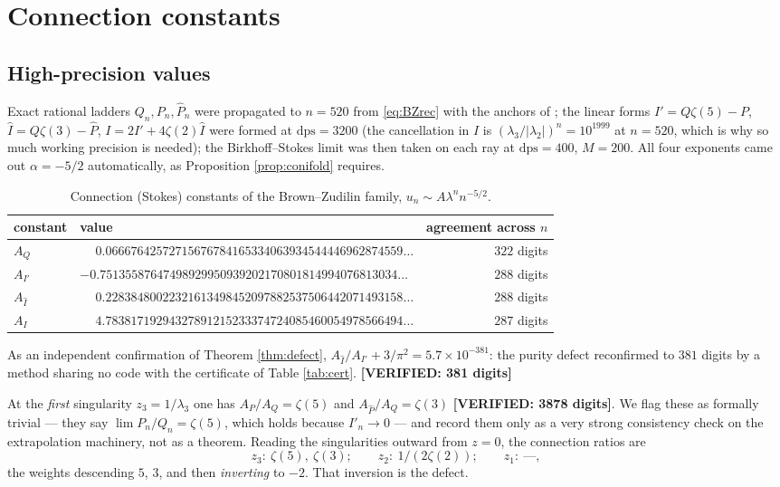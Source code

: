 \documentclass[11pt,reqno]{amsart}
\theoremstyle{plain}
\theoremstyle{definition}
\theoremstyle{remark}
\newcommand{\VER}[1]{{\normalfont\sffamily\bfseries[VERIFIED: #1]}}
\newcommand{\dps}{\mathrm{dps}}
\newcommand{\Ihat}{\widehat{I}}
\newcommand{\Phat}{\widehat{P}}
\begin{document}
\section{Connection constants}\label{sec:conn}

\subsection{High-precision values}
Exact rational ladders $Q_n,P_n,\Phat_n$ were propagated to $n=520$ from \eqref{eq:BZrec} with
the anchors of \cite{BZ}; the linear forms $I'=Q\zeta(5)-P$, $\Ihat=Q\zeta(3)-\Phat$,
$I=2I'+4\zeta(2)\Ihat$ were formed at $\dps=3200$ (the cancellation in $I$ is
$(\lambda_3/|\lambda_2|)^n=10^{1999}$ at $n=520$, which is why so much working precision is
needed); the Birkhoff--Stokes limit was then taken on each ray at $\dps=400$, $M=200$. All four
exponents came out $\alpha=-5/2$ automatically, as Proposition \ref{prop:conifold} requires.

\begin{table}[h]
\centering
\caption{Connection (Stokes) constants of the Brown--Zudilin family, $u_n\sim A\lambda^n
n^{-5/2}$.}
\label{tab:conn}
\small
\begin{tabular}{@{}llr@{}}
\toprule
constant & value & agreement across $n$\\
\midrule
$A_Q$      & $\phantom{-}0.06667642572715676784165334063934544446962874559\ldots$ & $322$ digits\\
$A_{I'}$   & $-0.75135587647498929950939202170801814994076813034\ldots$          & $288$ digits\\
$A_{\Ihat}$& $\phantom{-}0.22838480022321613498452097882537506442071493158\ldots$ & $288$ digits\\
$A_I$      & $\phantom{-}4.78381719294327891215233374724085460054978566494\ldots$ & $287$ digits\\
\bottomrule
\end{tabular}
\end{table}

As an independent confirmation of Theorem \ref{thm:defect},
$A_{\Ihat}/A_{I'}+3/\pi^2=5.7\times10^{-381}$: the purity defect reconfirmed to $381$ digits by a
method sharing no code with the certificate of Table \ref{tab:cert}. \VER{381 digits}

At the \emph{first} singularity $z_3=1/\lambda_3$ one has $A_P/A_Q=\zeta(5)$ and
$A_{\Phat}/A_Q=\zeta(3)$ \VER{3878 digits}. We flag these as formally trivial --- they say
$\lim P_n/Q_n=\zeta(5)$, which holds because $I'_n\to0$ --- and record them only as a very strong
consistency check on the extrapolation machinery, not as a theorem. Reading the singularities
outward from $z=0$, the connection ratios are
\[
  z_3:\ \zeta(5),\ \zeta(3);\qquad z_2:\ 1/(2\zeta(2));\qquad z_1:\ \text{---},
\]
the weights descending $5$, $3$, and then \emph{inverting} to $-2$. That inversion is the defect.
\end{document}

